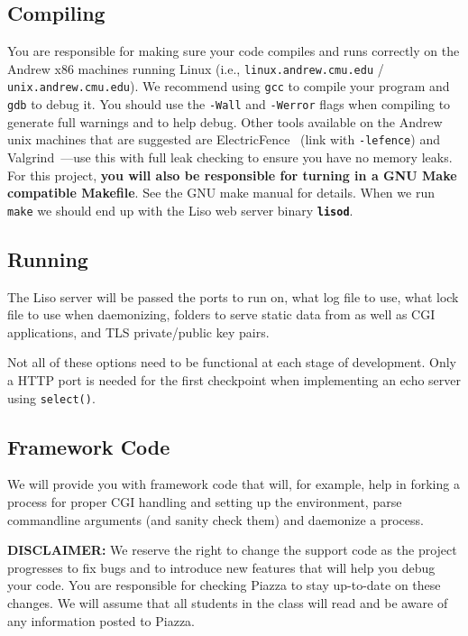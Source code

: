 \subsection{Compiling}
You are responsible for making sure your code compiles and runs correctly on
the Andrew x86 machines running Linux (i.e., \texttt{linux.andrew.cmu.edu} /
\texttt{unix.andrew.cmu.edu}). We recommend using \texttt{gcc} to compile your
program and \texttt{gdb} to debug it. You should use the \texttt{-Wall} and
\texttt{-Werror} flags when compiling to generate full warnings and to help
debug. Other tools available on the Andrew unix machines that are suggested are
ElectricFence~\cite{WWW:efence} (link with \texttt{-lefence}) and
Valgrind~\cite{WWW:Valgrind}---use this with full leak checking to ensure you
have no memory leaks.  For this project, \textbf{you will also be responsible
for turning in a GNU Make compatible Makefile}. See the GNU make
manual\cite{Manual:Make} for details. When we run \texttt{make} we should end
up with the Liso web server binary \textbf{\texttt{lisod}}.
\subsection{Running}
The Liso server will be passed the ports to run on, what log file to use, what
lock file to use when daemonizing, folders to serve static data from as well
as CGI applications, and TLS private/public key pairs.

Not all of these options need to be functional at each stage of development.
Only a HTTP port is needed for the first checkpoint when implementing an echo server
using \texttt{select()}.

\subsection{Framework Code} 
We will provide you with framework code that will, for example, help in forking
a process for proper CGI handling and setting up the environment, parse
commandline arguments (and sanity check them) and daemonize a process.

\textbf{DISCLAIMER:} We reserve the right to change the support code as the
project progresses to fix bugs and to introduce new features that will help you
debug your code. You are responsible for checking Piazza to stay
up-to-date on these changes. We will assume that all students in the class will
read and be aware of any information posted to Piazza.

